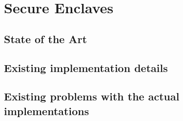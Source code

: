 \chapter{Secure Enclaves}
\label{cha:secenc}


\section{State of the Art}

\section{Existing implementation details}

\section{Existing problems with the actual implementations}
